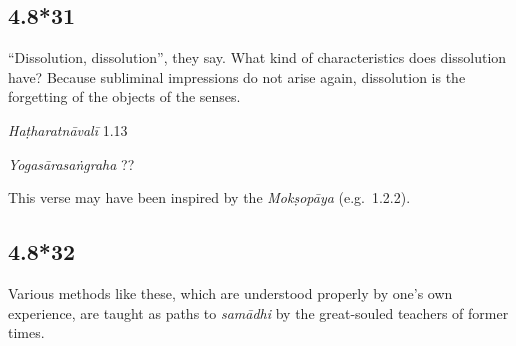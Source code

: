 \begin{ekdosis}

\subsection*{4.8*31}
\begin{translation}[hp04_008_31]
“Dissolution, dissolution”, they say. What kind of characteristics does dissolution have? Because subliminal impressions do not arise again, dissolution is the forgetting of the objects of the senses.
\end{translation}


\begin{testimonia}[hp04_008_31]
\emph{Haṭharatnāvalī} 1.13
\begin{versinnote}
\end{versinnote}

\emph{Yogasārasaṅgraha} ??
\begin{versinnote}
\end{versinnote}
\end{testimonia}

\begin{philcomm}[hp04_008_31]
This verse may have been inspired by the \emph{Mokṣopāya} (e.g.~1.2.2).
\end{philcomm}

\subsection*{4.8*32}
\begin{translation}[hp04_008_32]
Various methods like these, which are understood properly by one's own experience, are taught as paths to \textit{samādhi} by the great-souled teachers of former times.
\end{translation}



\end{ekdosis}
